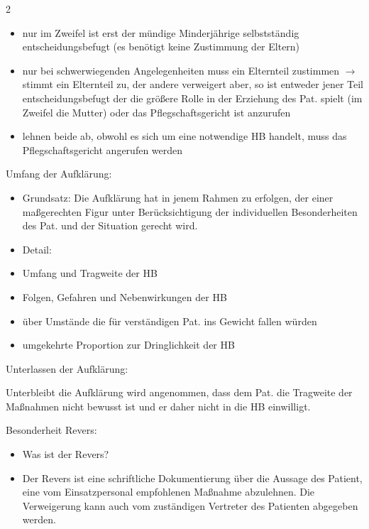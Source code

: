 \documentclass{article}
\begin{document}
\begin{multicols}{2}
\begin{itemize}
\item nur im Zweifel ist erst der m\"undige Minderj\"ahrige
selbstst\"andig entscheidungsbefugt (es ben\"otigt keine Zustimmung der
Eltern) 

\item nur bei schwerwiegenden Angelegenheiten muss ein Elternteil
zustimmen ${\rightarrow}$ stimmt ein Elternteil zu, der andere
verweigert aber, so ist  entweder jener Teil entscheidungsbefugt der
die gr\"o{\ss}ere Rolle in der Erziehung des Pat. spielt (im Zweifel
die Mutter) oder das Pflegschaftsgericht ist anzurufen

\item lehnen beide ab, obwohl es sich um eine notwendige HB handelt,
muss das Pflegschaftsgericht angerufen werden

\end{itemize}
Umfang der Aufkl\"arung:

\begin{itemize}
\item Grundsatz: Die Aufkl\"arung hat in jenem Rahmen zu erfolgen, der
einer ma{\ss}gerechten Figur unter Ber\"ucksichtigung der individuellen
Besonderheiten des Pat. und der Situation gerecht wird.

\item Detail:

\end{itemize}
\begin{itemize}
\item Umfang und Tragweite der HB

\item Folgen, Gefahren und Nebenwirkungen der HB

\item \"uber Umst\"ande die f\"ur verst\"andigen Pat. ins Gewicht fallen
w\"urden

\item umgekehrte Proportion zur Dringlichkeit der HB

\end{itemize}
Unterlassen der Aufkl\"arung:

Unterbleibt die Aufkl\"arung wird angenommen, dass dem Pat. die
Tragweite der Ma{\ss}nahmen nicht bewusst ist und er daher nicht in die
HB einwilligt. 

Besonderheit Revers:

\begin{itemize}
\item Was ist der Revers?

\end{itemize}
\begin{itemize}
\item Der Revers ist eine schriftliche Dokumentierung \"uber die Aussage
des Patient, eine vom Einsatz\-personal empfohlenen Ma{\ss}nahme
abzulehnen. Die Verweigerung kann auch vom zust\"andigen Vertreter des
Patienten abgegeben werden.


\end{itemize}
\end{multicols}
\end{document}
